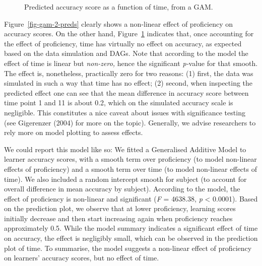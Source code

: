 \documentclass[
  letterpaper,
  DIV=11,
  numbers=noendperiod]{scrartcl}
\begin{document}
\begin{figure}[H]


\caption{\label{fig-gam-2-preds-t}Predicted accuracy score as a function
of time, from a GAM.}

\end{figure}%

Figure~\ref{fig-gam-2-preds} clearly shows a non-linear effect of
proficiency on accuracy scores. On the other hand,
Figure~\ref{fig-gam-2-preds-t} indicates that, once accounting for the
effect of proficiency, time has virtually no effect on accuracy, as
expected based on the data simulation and DAGs. Note that according to
the model the effect of time is linear but \emph{non-zero,} hence the
significant \emph{p-}value for that smooth. The effect is, nonetheless,
practically zero for two reasons: (1) first, the data was simulated in
such a way that time has no effect; (2) second, when inspecting the
predicted effect one can see that the mean difference in accuracy score
between time point 1 and 11 is about 0.2, which on the simulated
accuracy scale is negligible. This constitutes a nice caveat about
issues with significance testing (see Gigerenzer (2004) for more on the
topic). Generally, we advise researchers to rely more on model plotting
to assess effects.

We could report this model like so: We fitted a Generalised Additive
Model to learner accuracy scores, with a smooth term over proficiency
(to model non-linear effects of proficiency) and a smooth term over time
(to model non-linear effects of time). We also included a random
intercept smooth for subject (to account for overall difference in mean
accuracy by subject). According to the model, the effect of proficiency
is non-linear and significant (\emph{F} = 4638.38, \emph{p} \textless{}
0.0001). Based on the prediction plot, we observe that at lower
proficiency, learning scores initially decrease and then start
increasing again when proficiency reaches approximately 0.5. While the
model summary indicates a significant effect of time on accuracy, the
effect is negligibly small, which can be observed in the prediction plot
of time. To summarise, the model suggests a non-linear effect of
proficiency on learners' accuracy scores, but no effect of time.
\end{document}
